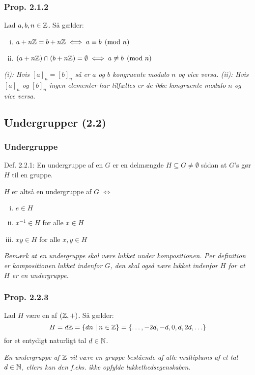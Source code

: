 \subsubsection{Prop. 2.1.2}
\label{2.1.2}
Lad $a, b, n \in \mathbb{Z}$. Så gælder:
\begin{enumerate}[(i)]
  \item $a + n\mathbb{Z} = b + n\mathbb{Z}
  \iff a \equiv b \pmod{n}$

  \item $(a + n\mathbb{Z}) \cap (b + n\mathbb{Z}) = \emptyset
  \iff a \not \equiv b \pmod{n}$ 
\end{enumerate}
\textit{(i): Hvis $[a]_n = [b]_n$ så er $a$ og $b$ kongruente modulo $n$ og vice
versa. (ii): Hvis $[a]_n$ og $[b]_n$ ingen elementer har tilfælles er de ikke
kongruente modulo $n$ og vice versa.}

\subsection{Undergrupper (2.2)}
\subsubsection{Undergruppe}
\label{Undergruppe}
Def. 2.2.1: En undergruppe af en  $G$ er en delmængde $H
\subseteq G \neq \emptyset$ sådan at $G$'s  gør $H$ til en
gruppe. 

$H$ er altså en undergruppe af $G$ $\iff$
\begin{enumerate}[(i)]
  \item $e \in H$
  \item $x^{-1} \in H$ for alle $x \in H$
  \item $xy \in H$ for alle $x, y \in H$
\end{enumerate}
\textit{Bemærk at en undergruppe skal være lukket under kompositionen. Per
definition er kompositionen lukket indenfor $G$, den skal også være lukket
indenfor $H$ for at $H$ er en undergruppe.}

\subsubsection{Prop. 2.2.3}
\label{2.2.3}
Lad $H$ være en  af $(\mathbb{Z}, +)$. Så gælder:
\begin{equation*}
  H = d\mathbb{Z} = \{ dn \mid n \in \mathbb{Z} \} = \{ \ldots, -2d, -d, 0, d, 2d, \ldots \}
\end{equation*}
for et entydigt naturligt tal $d\in \mathbb{N}$.

\textit{En undergruppe af $\mathbb{Z}$ vil være en gruppe bestående af alle multiplums
af et tal $d \in \mathbb{N}$, ellers kan den f.eks. ikke opfylde lukkethedsegenskaben}.


